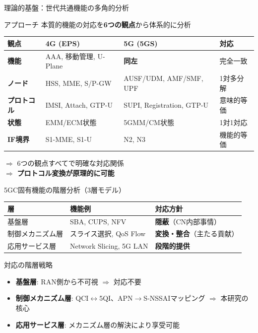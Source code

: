 \documentclass[dvipdfmx,11pt,aspectratio=169]{beamer}
\begin{document}
\begin{frame}{理論的基盤：世代共通機能の多角的分析}
  \begin{block}{アプローチ}
    本質的機能の対応を\textbf{6つの観点}から体系的に分析
  \end{block}

  \begin{table}
    \small
    \begin{tabular}{|l|l|l|l|}
      \hline
      \textbf{観点} & \textbf{4G (EPS)} & \textbf{5G (5GS)} & \textbf{対応} \\
      \hline
      \textbf{機能} & AAA, 移動管理, U-Plane & \textbf{同左} & \alert{完全一致} \\
      \hline
      \textbf{ノード} & HSS, MME, S/P-GW & AUSF/UDM, AMF/SMF, UPF & 1対多分解 \\
      \hline
      \textbf{プロトコル} & IMSI, Attach, GTP-U & SUPI, Registration, GTP-U & 意味的等価 \\
      \hline
      \textbf{状態} & EMM/ECM状態 & 5GMM/CM状態 & 1対1対応 \\
      \hline
      \textbf{IF境界} & S1-MME, S1-U & N2, N3 & 機能的等価 \\
      \hline
    \end{tabular}
  \end{table}

  \vspace{0.2cm}
  $\Rightarrow$ 6つの観点すべてで明確な対応関係 \\
  $\Rightarrow$ \textbf{プロトコル変換が原理的に可能}
\end{frame}

\begin{frame}{5GC固有機能の階層分析（3層モデル）}
  \begin{table}
    \small
    \begin{tabular}{|l|l|l|}
      \hline
      \textbf{層} & \textbf{機能例} & \textbf{対応方針} \\
      \hline
      基盤層 & SBA, CUPS, NFV & \textbf{隠蔽}（CN内部事情） \\
      \hline
      制御メカニズム層 & スライス選択, QoS Flow & \textbf{変換・整合}（主たる貢献） \\
      \hline
      応用サービス層 & Network Slicing, 5G LAN & \textbf{段階的提供} \\
      \hline
    \end{tabular}
  \end{table}

  \vspace{0.3cm}
  \begin{block}{対応の階層戦略}
    \begin{itemize}
      \item \textbf{基盤層}: RAN側から不可視 $\Rightarrow$ 対応不要
      \item \textbf{制御メカニズム層}: QCI$\leftrightarrow$5QI、APN$\rightarrow$S-NSSAIマッピング $\Rightarrow$ \alert{本研究の核心}
      \item \textbf{応用サービス層}: メカニズム層の解決により享受可能
    \end{itemize}
  \end{block}
\end{frame}
\end{document}
